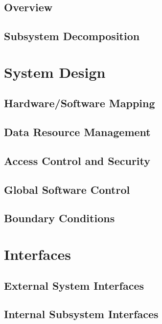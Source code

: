 \documentclass{report}
\begin{document}
\section{Overview}

\section{Subsystem Decomposition}

\chapter{System Design} %
\label{ch:system-design}

\section{Hardware/Software Mapping}

\section{Data Resource Management}

\section{Access Control and Security}

\section{Global Software Control}

\section{Boundary Conditions}

\chapter{Interfaces} %
\label{ch:interfaces}

\section{External System Interfaces}

\section{Internal Subsystem Interfaces}
\end{document}
